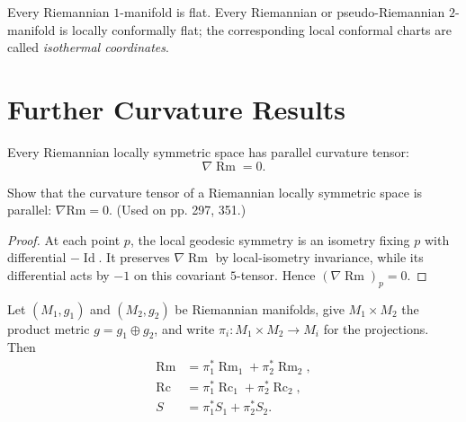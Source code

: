 Every Riemannian $1$-manifold is flat.  Every Riemannian or
pseudo-Riemannian $2$-manifold is locally conformally flat; the corresponding
local conformal charts are called \emph{isothermal coordinates}.

\section{Further Curvature Results}

\begin{proposition}
\label{prop:symmetric-space-parallel-curvature}
Every Riemannian locally symmetric space has parallel curvature tensor:
\[
\nabla\operatorname{Rm}=0.
\]
\end{proposition}

\begin{exercise}
\label{prob:symmetric-space-parallel-curvature}
Show that the curvature tensor of a Riemannian locally symmetric space is parallel: $\nabla \text{Rm} = 0$. (Used on pp. 297, 351.)
\end{exercise}

\begin{proof}
\sketch
At each point $p$, the local geodesic symmetry is an isometry fixing $p$ with
differential $-\operatorname{Id}$. It preserves $\nabla\operatorname{Rm}$ by
local-isometry invariance, while its differential acts by $-1$ on this
covariant $5$-tensor. Hence $(\nabla\operatorname{Rm})_p=0$.
\end{proof}

\begin{proposition}
\label{prop:product-metric-curvature}
Let $(M_1,g_1)$ and $(M_2,g_2)$ be Riemannian manifolds, give
$M_1\times M_2$ the product metric $g=g_1\oplus g_2$, and write
$\pi_i\colon M_1\times M_2\to M_i$ for the projections. Then
\begin{align*}
\operatorname{Rm}&=\pi_1^*\operatorname{Rm}_1+\pi_2^*\operatorname{Rm}_2,\\
\operatorname{Rc}&=\pi_1^*\operatorname{Rc}_1+\pi_2^*\operatorname{Rc}_2,\\
S&=\pi_1^*S_1+\pi_2^*S_2.
\end{align*}
\end{proposition}

